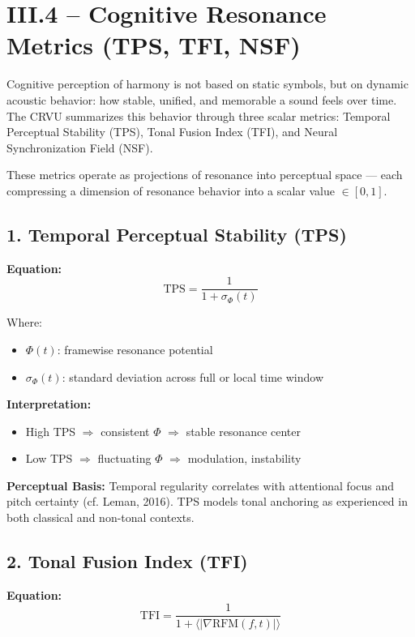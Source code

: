 \documentclass{article}
\begin{document}
\section*{III.4 – Cognitive Resonance Metrics (TPS, TFI, NSF)}

Cognitive perception of harmony is not based on static symbols, but on dynamic acoustic behavior: how stable, unified, and memorable a sound feels over time. The CRVU summarizes this behavior through three scalar metrics: Temporal Perceptual Stability (TPS), Tonal Fusion Index (TFI), and Neural Synchronization Field (NSF).

These metrics operate as projections of resonance into perceptual space — each compressing a dimension of resonance behavior into a scalar value $\in [0, 1]$.

\subsection*{1. Temporal Perceptual Stability (TPS)}

\textbf{Equation:}
\[
\text{TPS} = \frac{1}{1 + \sigma_\Phi(t)}
\]

Where:

\begin{itemize}
    \item $\Phi(t)$: framewise resonance potential
    \item $\sigma_\Phi(t)$: standard deviation across full or local time window
\end{itemize}

\textbf{Interpretation:}

\begin{itemize}
    \item High TPS $\Rightarrow$ consistent $\Phi$ $\Rightarrow$ stable resonance center
    \item Low TPS $\Rightarrow$ fluctuating $\Phi$ $\Rightarrow$ modulation, instability
\end{itemize}

\textbf{Perceptual Basis:} Temporal regularity correlates with attentional focus and pitch certainty (cf. Leman, 2016). TPS models tonal anchoring as experienced in both classical and non-tonal contexts.

\subsection*{2. Tonal Fusion Index (TFI)}

\textbf{Equation:}
\[
\text{TFI} = \frac{1}{1 + \langle |\nabla \text{RFM}(f, t)| \rangle}
\]
\end{document}
